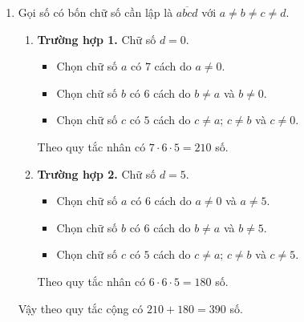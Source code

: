 \begin{vd}
{\begin{enumerate}
			\begin{enumerate}
				\item \textbf{Trường hợp 1.} Chữ số $d=0$.
				\begin{itemize}
					\item Chọn chữ số $a$ có $7$ cách do $a\ne 0$.
					\item Chọn chữ số $b$ có $6$ cách do $b\ne a$ và $b\ne 0$.
					\item Chọn chữ số $c$ có $5$ cách do $c\ne a$; $c\ne b$ và $c\ne 0$.
				\end{itemize}
				Theo quy tắc nhân có $7\cdot 6\cdot 5=210$ số.
				\item \textbf{Trường hợp 2.} Chữ số $d\in \{2;4;6\}$ nên có $3$ cách chọn.
				\begin{itemize}
					\item Chọn chữ số $a$ có $6$ cách do $a\ne 0$ và $a \ne d$.
					\item Chọn chữ số $b$ có $6$ cách do $b\ne a$ và $b\ne d$.
					\item Chọn chữ số $c$ có $5$ cách do $c\ne a$; $c\ne b$ và $c\ne d$.
				\end{itemize}
				Theo quy tắc nhân có $3\cdot 6\cdot 6\cdot 5=540$ số.
			\end{enumerate}
			Vậy theo quy tắc cộng có $210+540=750$ số.	
			\item Gọi số có bốn chữ số cần lập là $\overline{abcd}$ với $a\ne b\ne c\ne d$.
			\begin{enumerate}
				\item \textbf{Trường hợp 1.} Chữ số $d=0$.
				\begin{itemize}
					\item Chọn chữ số $a$ có $7$ cách do $a\ne 0$.
					\item Chọn chữ số $b$ có $6$ cách do $b\ne a$ và $b\ne 0$.
					\item Chọn chữ số $c$ có $5$ cách do $c\ne a$; $c\ne b$ và $c\ne 0$.
				\end{itemize}
				Theo quy tắc nhân có $7\cdot 6\cdot 5=210$ số.
				\item \textbf{Trường hợp 2.} Chữ số $d=5$.
				\begin{itemize}
					\item Chọn chữ số $a$ có $6$ cách do $a\ne 0$ và $a \ne 5$.
					\item Chọn chữ số $b$ có $6$ cách do $b\ne a$ và $b\ne 5$.
					\item Chọn chữ số $c$ có $5$ cách do $c\ne a$; $c\ne b$ và $c\ne 5$.
				\end{itemize}
				Theo quy tắc nhân có $6\cdot 6\cdot 5=180$ số.
			\end{enumerate}
			Vậy theo quy tắc cộng có $210+180=390$ số.	
			\end{enumerate}
	}
\end{vd}
